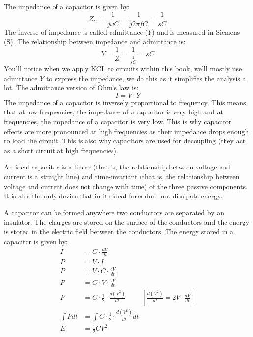 The impedance of a capacitor is given by:
\[
  Z_C = \frac{1}{j\omega C} = \frac{1}{j 2 \pi f C} = \frac{1}{s C}
\]
The inverse of impedance is called admittance (\(Y\)) and is measured in
Siemens (S). The relationship between impedance and admittance is:
\[
  Y = \frac{1}{Z} = \frac{1}{\frac{1}{sC}} = sC
\]
You'll notice when we apply KCL to circuits within this book, we'll mostly
use admittance \(Y\) to express the impedance, we do this as it simplifies
the analysis a lot. The admittance version of Ohm's law is:
\[
  I = V \cdot Y
\]
The impedance of a capacitor is inversely proportional to frequency. This
means that at low frequencies, the impedance of a capacitor is very high and
at frequencies, the impedance of a capacitor is very low. This is why
capacitor effects are more pronounced at high frequencies as their
impedance drops enough to load the circuit. This is also why capacitors are
used for decoupling (they act as a short circuit at high frequencies).

An ideal capacitor is a linear (that is, the relationship between voltage and
current is a straight line) and time-invariant (that is, the relationship
between voltage and current does not change with time) of the three passive
components. It is also the only device that in its ideal form does not
dissipate energy.

A capacitor can be formed anywhere two conductors are separated by an
insulator. The charges are stored on the surface of the  conductors and the
energy is stored in the electric field between the  conductors. The energy
stored in a capacitor is given by:
\begin{align*}
  I &= C \cdot \frac{dV}{dt} \\
  P &= V \cdot I \\
  P &= V \cdot C \cdot \frac{dV}{dt} \\
  P &= C \cdot V \cdot \frac{dV}{dt} \\
  P &= C \cdot \frac{1}{2} \cdot \frac{d(V^2)}{dt} \hspace{1cm} [\frac{d(V^2)}{dt} = 2V \cdot \frac{dV}{dt}] \\
  \int P dt &= \int C \cdot \frac{1}{2} \cdot \frac{d(V^2)}{dt} dt \\
  E &= \frac{1}{2} C V^2
\end{align*}

